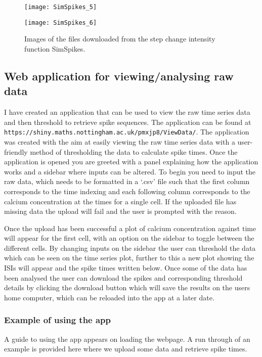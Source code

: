 \documentclass[../main.tex]{subfiles}
\begin{document}
\begin{figure}
	\begin{subfloat}[]{
	\texttt{[image: SimSpikes\_5]}}
	\end{subfloat}
	\begin{subfloat}[]{
	\texttt{[image: SimSpikes\_6]}}
	\end{subfloat}	
		\caption{Images of the files downloaded from the step change intensity function {SimSpikes}. }
\label{fig: SimSpikes Download}
\end{figure}


\subsection{Web application for viewing/analysing raw data}
I have created an application that can be used to view the raw time series data and then  threshold to retrieve spike sequences. The application can be found at {\tt https://shiny.maths.nottingham.ac.uk/pmxjp8/ViewData/}. The application was created with the aim at easily viewing the raw time series data with a user-friendly method of thresholding the data to calculate spike times. Once the application is opened you are greeted with a panel explaining how the application works and a sidebar where inputs can be altered. To begin you need to input the raw data, which needs to be formatted in a `.csv' file such that the first column corresponds to the time indexing and each following column corresponds to the calcium concentration at the times for a single cell. If the uploaded file has missing data the upload will fail and the user is prompted with the reason. 

Once the upload has been successful a plot of calcium concentration against time will appear for the first cell, with an option on the sidebar to toggle between the different cells. By changing inputs on the sidebar the user can threshold the data which can be seen on the time series plot, further to this a new plot showing the ISIs will appear and the spike times written below. Once some of the data has been analysed the user can download the spikes and corresponding threshold details by clicking the download button which will save the results on the users home computer, which can be reloaded into the app at a later date.   

\subsubsection{Example of using the app}
A guide to using the app appears on loading the webpage. A run through of an example is provided here where we upload some data and retrieve spike times.
\end{document}
